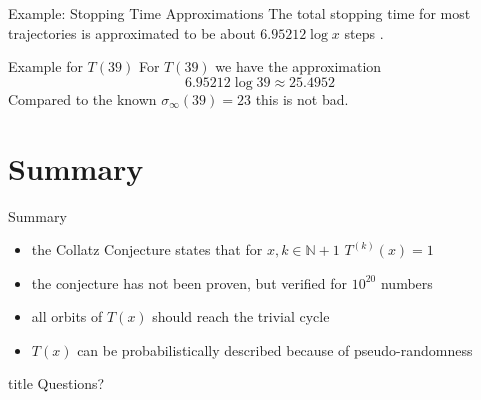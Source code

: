 \documentclass[hyperref={colorlinks,allcolors=black}]{beamer}
\begin{document}

\begin{frame}{Example: Stopping Time Approximations}
The total stopping time for most trajectories is approximated to be about 
$6.95212 \log x$ steps \cite{src:lagarias}.
\begin{block}{Example for $T(39)$}
For $T(39)$ we have the approximation
\begin{equation}\nonumber
    6.95212 \log 39 \approx 25.4952
\end{equation}
Compared to the known $\sigma_{\infty}(39)=23$ this is not bad.
\end{block}
\end{frame}


\section{Summary}

\begin{frame}{Summary}
\begin{itemize}
    \item the Collatz Conjecture states that for $x,k \in \mathbb{N} + 1$
        $T^{(k)}(x)=1$
    \item the conjecture has not been proven, but verified for $10^{20}$
        numbers
    \item all orbits of $T(x)$ should reach the trivial cycle
    \item $T(x)$ can be probabilistically described because of pseudo-randomness
\end{itemize}
\end{frame}

\begin{frame}
    \vfill
    \centering
    \begin{beamercolorbox}[sep=8pt,center,shadow=false,rounded=false]{title}
    Questions?\par
    \end{beamercolorbox}
    \vfill
\end{frame}

\end{document}
